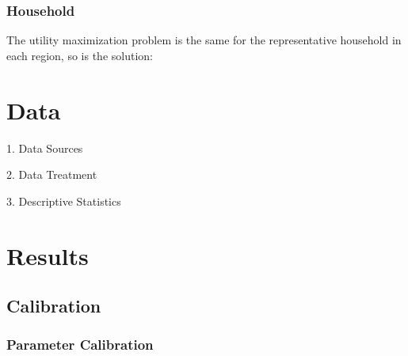 \documentclass[
	12pt,
	]{article}
\numberwithin{equation}{section}
\theoremstyle{definition}
\theoremstyle{plain}
\theoremstyle{plain}
\theoremstyle{plain}
\begin{document}
\newpage

\subsubsection{Household}

The utility maximization problem is the same for the representative household in each region, so is the solution:

\newpage


\section{Data}

\lipsum[1]

1. Data Sources

2. Data Treatment

3. Descriptive Statistics


\section{Results}

\lipsum[1]

\subsection{Calibration}


\subsubsection{Parameter Calibration}

\vspace*{-1cm}
\end{document}
